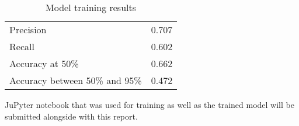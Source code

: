 \documentclass[10pt,twocolumn,letterpaper]{article}
\begin{document}
\begin{table}[!h]
    \begin{center}
        \caption{Model training results}
        \label{results-table}
        \begin{tabular}{ |l||c| }
            \hline
            Precision & 0.707 \\
            Recall & 0.602 \\
            Accuracy at 50\% & 0.662 \\
            Accuracy between 50\% and 95\% & 0.472 \\
            \hline
        \end{tabular}
    \end{center}
\end{table}

JuPyter notebook that was used for training as well as the trained model will be submitted alongside with this report.


{
    \small
    
    
}
\end{document}
